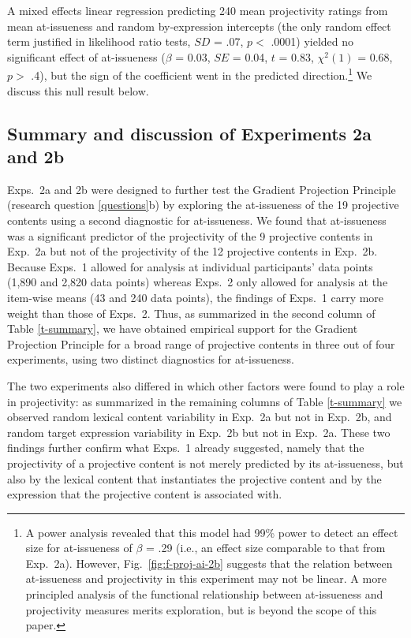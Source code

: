 \documentclass[11pt,fleqn]{article}
\newcommand{\6}{\mbox{$[\hspace*{-.6mm}[$}}
\newcommand{\9}{\mbox{$]\hspace*{-.6mm}]$}}
\newcommand{\figref}[1]{Fig.~\ref{#1}}
\begin{document}
A mixed effects linear regression predicting 240 mean projectivity ratings from mean at-issueness and random by-expression intercepts (the only random effect term justified in likelihood ratio tests, $SD$ = .07, $p <$ .0001) yielded no significant effect of at-issueness ($\beta$ = 0.03, $SE$ = 0.04, $t$ = 0.83, $\chi^2(1)$ = 0.68, $p >$ .4), but the sign of the coefficient went in the predicted direction.\footnote{A power analysis revealed that this model had 99\% power to detect an effect size for at-issueness of $\beta$ = .29 (i.e., an effect size comparable to that from Exp.~2a).  However, \figref{fig:f-proj-ai-2b} suggests that the relation between at-issueness and projectivity in this experiment may not be linear. A more principled analysis of the functional relationship between at-issueness and projectivity measures merits exploration, but is beyond the scope of this paper.   %
} We discuss this null result below.


\subsection{Summary and discussion of Experiments 2a and 2b}\label{s-disc2}

Exps.~2a and 2b were designed to further test the Gradient Projection Principle (research question \ref{questions}b) by exploring the at-issueness of the 19 projective contents using a second diagnostic for at-issueness. We found that at-issueness was a significant predictor of the projectivity of the 9 projective contents in Exp.~2a but not of the projectivity of the 12 projective contents in Exp.~2b. Because Exps.~1 allowed for analysis at individual participants' data points (1,890 and 2,820 data points) whereas Exps.~2 only allowed for analysis at the item-wise means (43 and 240 data points), the findings of Exps.~1 carry more weight than those of Exps.~2. Thus, as summarized in the second column of Table \ref{t-summary}, we have obtained empirical support for the Gradient Projection Principle for a broad range of projective contents in three out of four experiments, using two distinct diagnostics for at-issueness. 

The two experiments also differed in which other factors were found to play a role in projectivity: as summarized in the remaining columns of Table \ref{t-summary} we observed random lexical content variability in Exp.~2a but not in Exp.~2b, and random target expression variability in Exp.~2b but not in Exp.~2a. These two findings further confirm what Exps.~1 already suggested, namely that the projectivity of a projective content is not merely predicted by its at-issueness, but also by the lexical content that instantiates the projective content and by the expression that the projective content is associated with. 
\end{document}
